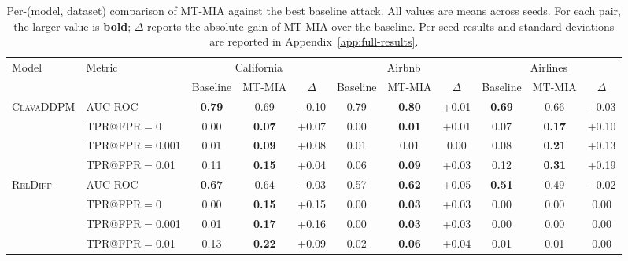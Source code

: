 \begin{table}[t]
  \centering
  \small
  \setlength{\tabcolsep}{4pt}
  \caption{Per-(model, dataset) comparison of MT-MIA against the best baseline attack. All values are means across seeds. For each pair, the larger value is \textbf{bold}; $\Delta$ reports the absolute gain of MT-MIA over the baseline. Per-seed results and standard deviations are reported in Appendix~\ref{app:full-results}.}
  \label{tab:mt-mia-vs-baseline}
  \begin{tabular}{llccccccccc}
    \toprule
    Model & Metric & \multicolumn{3}{c}{California} & \multicolumn{3}{c}{Airbnb} & \multicolumn{3}{c}{Airlines} \\
    \cmidrule(lr){3-5} \cmidrule(lr){6-8} \cmidrule(lr){9-11}
     &  & Baseline & MT-MIA & $\Delta$ & Baseline & MT-MIA & $\Delta$ & Baseline & MT-MIA & $\Delta$ \\
    \midrule
    \textsc{ClavaDDPM} & AUC-ROC & \textbf{0.79} & 0.69 & \cellcolor{LossStrong}$-$0.10 & 0.79 & \textbf{0.80} & \cellcolor{GainLight}+0.01 & \textbf{0.69} & 0.66 & \cellcolor{LossLight}$-$0.03 \\
     & TPR@FPR$=$0 & 0.00 & \textbf{0.07} & \cellcolor{GainMed}+0.07 & 0.00 & \textbf{0.01} & \cellcolor{GainLight}+0.01 & 0.07 & \textbf{0.17} & \cellcolor{GainStrong}+0.10 \\
     & TPR@FPR$=$0.001 & 0.01 & \textbf{0.09} & \cellcolor{GainMed}+0.08 & 0.01 & 0.01 & 0.00 & 0.08 & \textbf{0.21} & \cellcolor{GainStrong}+0.13 \\
     & TPR@FPR$=$0.01 & 0.11 & \textbf{0.15} & \cellcolor{GainLight}+0.04 & 0.06 & \textbf{0.09} & \cellcolor{GainLight}+0.03 & 0.12 & \textbf{0.31} & \cellcolor{GainStrong}+0.19 \\
    \midrule
    \textsc{RelDiff} & AUC-ROC & \textbf{0.67} & 0.64 & \cellcolor{LossLight}$-$0.03 & 0.57 & \textbf{0.62} & \cellcolor{GainMed}+0.05 & \textbf{0.51} & 0.49 & \cellcolor{LossLight}$-$0.02 \\
     & TPR@FPR$=$0 & 0.00 & \textbf{0.15} & \cellcolor{GainStrong}+0.15 & 0.00 & \textbf{0.03} & \cellcolor{GainLight}+0.03 & 0.00 & 0.00 & 0.00 \\
     & TPR@FPR$=$0.001 & 0.01 & \textbf{0.17} & \cellcolor{GainStrong}+0.16 & 0.00 & \textbf{0.03} & \cellcolor{GainLight}+0.03 & 0.00 & 0.00 & 0.00 \\
     & TPR@FPR$=$0.01 & 0.13 & \textbf{0.22} & \cellcolor{GainMed}+0.09 & 0.02 & \textbf{0.06} & \cellcolor{GainLight}+0.04 & 0.01 & 0.01 & 0.00 \\

\end{tabular}
\end{table}
